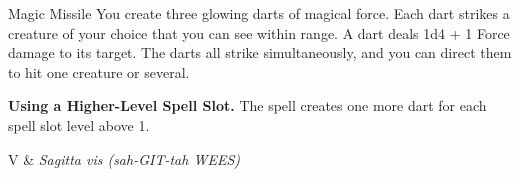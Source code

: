 \begin{Spell}[
  level=1st,
  time=1 Action,
  range=120 ft,
  components={V, S},
  duration=Instantaneous,
  school=Evocation,
  attack=None,
  effect=Force
]{Magic Missile}
You create three glowing darts of magical force. Each dart strikes a creature of your choice that you can see within range. A dart deals 1d4 + 1 Force damage to its target. The darts all strike simultaneously, and you can direct them to hit one creature or several.

\textbf{Using a Higher-Level Spell Slot.} The spell creates one more dart for each spell slot level above 1.

\begin{components}
V & \textit{Sagitta vis (sah-GIT-tah WEES)}
\end{components}
\end{Spell}


